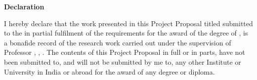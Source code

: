 \begin{flushright}
  \huge{\textbf{Declaration}}
\end{flushright}

\vspace{0.5cm}

I hereby declare that the work presented in this Project Proposal titled \ttitle{} submitted to the \univname{} in partial fulfilment of the requirements for the award of the degree of \degree{}, is a bonafide record of the research work carried out under the supervision of Professor \supname{}, \suppost{}, \supdeptname{}. The contents of this Project Proposal in full or in parts, have not been submitted to, and will not be submitted by me to, any other Institute or University in India or abroad for the award of any degree or diploma.

\vspace{2cm}

\begin{flushright}
  \emph{\authorname}\\
  \rn
\end{flushright}
